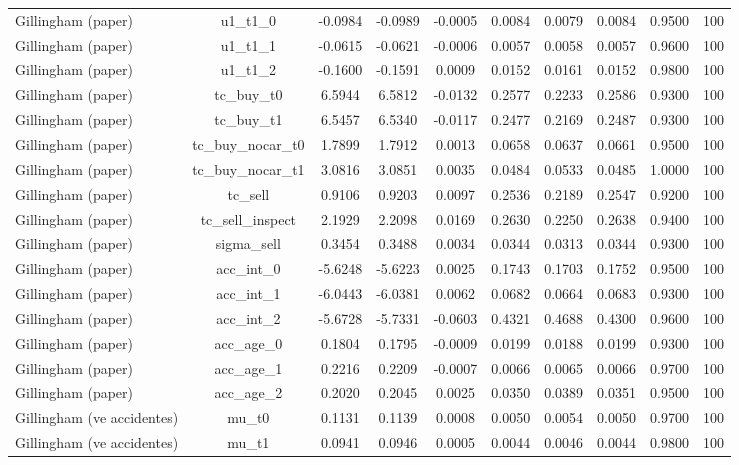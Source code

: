 \begin{table}[htbp]
\begin{tabular}{lccccccccc}
Gillingham (paper) & u1\_t1\_0 & -0.0984 & -0.0989 & -0.0005 & 0.0084 & 0.0079 & 0.0084 & 0.9500 & 100 \\
Gillingham (paper) & u1\_t1\_1 & -0.0615 & -0.0621 & -0.0006 & 0.0057 & 0.0058 & 0.0057 & 0.9600 & 100 \\
Gillingham (paper) & u1\_t1\_2 & -0.1600 & -0.1591 & 0.0009 & 0.0152 & 0.0161 & 0.0152 & 0.9800 & 100 \\
Gillingham (paper) & tc\_buy\_t0 & 6.5944 & 6.5812 & -0.0132 & 0.2577 & 0.2233 & 0.2586 & 0.9300 & 100 \\
Gillingham (paper) & tc\_buy\_t1 & 6.5457 & 6.5340 & -0.0117 & 0.2477 & 0.2169 & 0.2487 & 0.9300 & 100 \\
Gillingham (paper) & tc\_buy\_nocar\_t0 & 1.7899 & 1.7912 & 0.0013 & 0.0658 & 0.0637 & 0.0661 & 0.9500 & 100 \\
Gillingham (paper) & tc\_buy\_nocar\_t1 & 3.0816 & 3.0851 & 0.0035 & 0.0484 & 0.0533 & 0.0485 & 1.0000 & 100 \\
Gillingham (paper) & tc\_sell & 0.9106 & 0.9203 & 0.0097 & 0.2536 & 0.2189 & 0.2547 & 0.9200 & 100 \\
Gillingham (paper) & tc\_sell\_inspect & 2.1929 & 2.2098 & 0.0169 & 0.2630 & 0.2250 & 0.2638 & 0.9400 & 100 \\
Gillingham (paper) & sigma\_sell & 0.3454 & 0.3488 & 0.0034 & 0.0344 & 0.0313 & 0.0344 & 0.9300 & 100 \\
Gillingham (paper) & acc\_int\_0 & -5.6248 & -5.6223 & 0.0025 & 0.1743 & 0.1703 & 0.1752 & 0.9500 & 100 \\
Gillingham (paper) & acc\_int\_1 & -6.0443 & -6.0381 & 0.0062 & 0.0682 & 0.0664 & 0.0683 & 0.9300 & 100 \\
Gillingham (paper) & acc\_int\_2 & -5.6728 & -5.7331 & -0.0603 & 0.4321 & 0.4688 & 0.4300 & 0.9600 & 100 \\
Gillingham (paper) & acc\_age\_0 & 0.1804 & 0.1795 & -0.0009 & 0.0199 & 0.0188 & 0.0199 & 0.9300 & 100 \\
Gillingham (paper) & acc\_age\_1 & 0.2216 & 0.2209 & -0.0007 & 0.0066 & 0.0065 & 0.0066 & 0.9700 & 100 \\
Gillingham (paper) & acc\_age\_2 & 0.2020 & 0.2045 & 0.0025 & 0.0350 & 0.0389 & 0.0351 & 0.9500 & 100 \\
Gillingham (ve accidentes) & mu\_t0 & 0.1131 & 0.1139 & 0.0008 & 0.0050 & 0.0054 & 0.0050 & 0.9700 & 100 \\
Gillingham (ve accidentes) & mu\_t1 & 0.0941 & 0.0946 & 0.0005 & 0.0044 & 0.0046 & 0.0044 & 0.9800 & 100 \\

\end{tabular}
\end{table}
